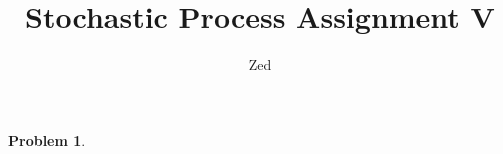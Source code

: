 \documentclass[a4paper, 10pt]{article}
\title{\textbf{Stochastic Process Assignment V}}
\author{Zed}
\theoremstyle{definition}
\newtheorem{problem}{Problem}
\theoremstyle{hSol}
\begin{document}
\maketitle

\begin{problem} 
\end{problem}
\end{document}
